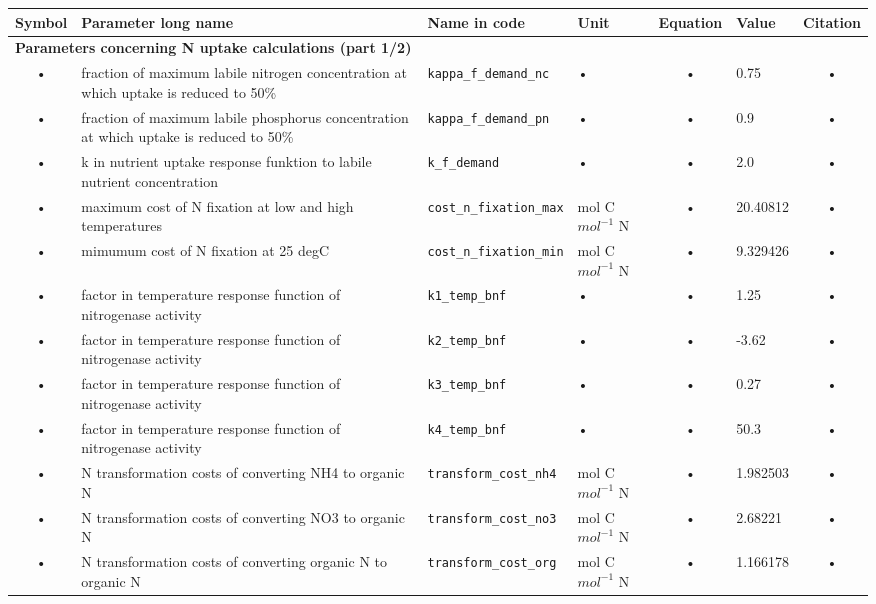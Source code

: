\begin{table}
\begin{tabularx}{\linewidth}{|c|X|l|l|c|l|c|} %
\hline 
Symbol & Parameter long name & Name in code & Unit & Equation & Value & Citation \\ 
\hline 

\multicolumn{6}{l}{\bf Parameters concerning N uptake calculations (part 1/2)}\\
\hline
• & fraction of maximum labile nitrogen concentration at which uptake is reduced to 50\% & \texttt{kappa\_f\_demand\_nc} & • & • & 0.75 & • \\
• & fraction of maximum labile phosphorus  concentration at which uptake is reduced to 50\% & \texttt{kappa\_f\_demand\_pn} & • & • & 0.9 & • \\
• & k in nutrient uptake response funktion to labile nutrient concentration & \texttt{k\_f\_demand} & • & • & 2.0 & • \\
• & maximum cost of N fixation at low and high temperatures & \texttt{cost\_n\_fixation\_max} & mol C $mol^{-1}$ N & • & 20.40812 & • \\
• & mimumum cost of N fixation at 25 degC & \texttt{cost\_n\_fixation\_min} & mol C $mol^{-1}$ N & • & 9.329426 & • \\
• & factor in temperature response function of nitrogenase activity & \texttt{k1\_temp\_bnf} & • & • & 1.25 & • \\
• & factor in temperature response function of nitrogenase activity & \texttt{k2\_temp\_bnf} & • & • & -3.62 & • \\
• & factor in temperature response function of nitrogenase activity & \texttt{k3\_temp\_bnf} & • & • & 0.27 & • \\
• & factor in temperature response function of nitrogenase activity & \texttt{k4\_temp\_bnf} & • & • & 50.3 & • \\
• & N transformation costs of converting NH4 to organic N & \texttt{transform\_cost\_nh4} & mol C $mol^{-1}$ N & • & 1.982503 & • \\
• & N transformation costs of converting NO3 to organic N & \texttt{transform\_cost\_no3} & mol C $mol^{-1}$ N & • & 2.68221 & • \\
• & N transformation costs of converting organic N to organic N & \texttt{transform\_cost\_org} & mol C $mol^{-1}$ N & • & 1.166178 & • \\
\hline 
\end{tabularx}
\end{table}


